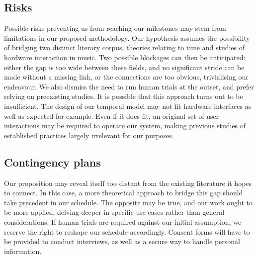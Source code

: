 \documentclass[journal,onecolumn]{IEEEtran}
\begin{document}
\subsection{Risks}
Possible risks preventing us from reaching our milestones may stem from limitations in our proposed methodology. Our hypothesis assumes the possibility of bridging two distinct literary corpus, theories relating to time and studies of hardware interaction in music. Two possible blockages can then be anticipated: either the gap is too wide between these fields, and no significant stride can be made without a missing link, or the connections are too obvious, trivialising our endeavour. We also dismiss the need to run human trials at the outset, and prefer relying on preexisting studies. It is possible that this approach turns out to be insufficient. The design of our temporal model may not fit hardware interfaces as well as expected for example. Even if it does fit, an original set of user interactions may be required to operate our system, making previous studies of established practices largely irrelevant for our purposes. 


\subsection{Contingency plans}
Our proposition may reveal itself too distant from the existing literature it hopes to connect. In this case, a more theoretical approach to bridge this gap should take precedent in our schedule. The opposite may be true, and our work ought to be more applied, delving deeper in specific use cases rather than general considerations. If human trials are required against our initial assumption, we reserve the right to reshape our schedule accordingly. Consent forms will have to be provided to conduct interviews, as well as a secure way to handle personal information.

\newpage
\end{document}
